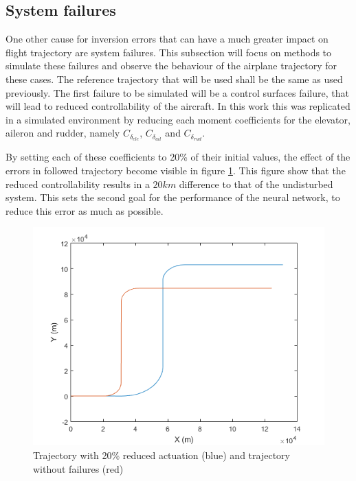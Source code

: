 \subsection{System failures}

One other cause for inversion errors that can have a much greater impact on flight trajectory are system failures. This subsection will focus on methods to simulate these failures and observe the behaviour of the airplane trajectory for these cases. The reference trajectory that will be used shall be the same as used previously. The first failure to be simulated will be a control surfaces failure, that will lead to reduced controllability of the aircraft. In this work this was replicated in a simulated environment by reducing each moment coefficients for the elevator, aileron and rudder, namely $C_{\delta_{ele}}$, $C_{\delta_{ail}}$ and $C_{\delta_{rud}}$.

By setting each of these coefficients to 20\% of their initial values, the effect of the errors in followed trajectory become visible in figure \ref{fig:reduced_act}. This figure show that the reduced controllability results in a $20km$ difference to that of the undisturbed system. This sets the second goal for the performance of the neural network, to reduce this error as much as possible.

\begin{figure}[H]
\centering
\includegraphics[width=\textwidth]{Figures/Results/reduced_act.png}
\caption[Trajectory with reduced actuation]{Trajectory with 20\% reduced actuation (blue) and trajectory without failures (red)}
\label{fig:reduced_act}
\end{figure}

